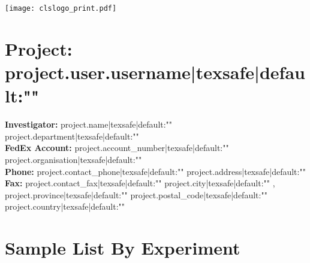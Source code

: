 \documentclass[6pt]{report}
\begin{document}
\hspace{-0.25in}
\texttt{[image: clslogo\_print.pdf]}

\vspace{-0.25in}

\small
\hspace{-0.25in}

\section*{Project: {{ project.user.username|texsafe|default:"" }} }
\begin{center}

{\bf Investigator: }{{ project.name|texsafe|default:"" }} \hfill  {{ project.department|texsafe|default:"" }} \\
{\bf FedEx Account: }{{ project.account_number|texsafe|default:"" }} \hfill {{ project.organisation|texsafe|default:"" }} \\
{\bf Phone: }{{ project.contact_phone|texsafe|default:"" }} \hfill {{ project.address|texsafe|default:"" }} \\
{\bf Fax: }{{ project.contact_fax|texsafe|default:"" }} \hfill {{ project.city|texsafe|default:"" }}, {{ project.province|texsafe|default:"" }}   {{ project.postal_code|texsafe|default:"" }} \\
\hfill {{ project.country|texsafe|default:"" }} \\ 
\end{center}

\section*{Sample List By Experiment}
\end{document}
